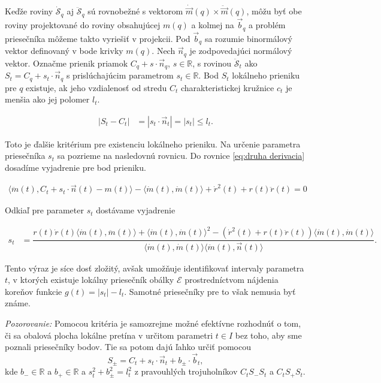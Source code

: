 Keďže roviny $\mathcal{\dot{S}}_q $ aj $\mathcal{\ddot{S}}_q $ sú rovnobežné s vektorom $ \dot{\vec{m}}(q) \times \ddot{\vec{m}}(q) $, môžu byť obe roviny projektované do roviny obsahujúcej $ m(q) $ a kolmej na $ \vec{b}_q $ a problém priesečníka môžeme takto vyriešiť v projekcii. Pod $ \vec{b}_q $ sa rozumie binormálový vektor definovaný v bode krivky $ m(q) $. Nech $\vec{n}_q$ je zodpovedajúci normálový vektor. Označme prienik priamok $C_q + s \cdot \vec{n}_q$, $s \in \mathbb{R}$, s rovinou $\mathcal{\ddot{S}}_t$ ako $S_t = C_q + s_t \cdot \vec{n}_q$ s prislúchajúcim parametrom $s_t \in \mathbb{R}$. Bod $S_t$ lokálneho prieniku pre $q$ existuje, ak jeho vzdialenosť od stredu $C_t$ charakteristickej kružnice $c_t$ je menšia ako jej polomer $l_t.$ 

\begin{align*}
| S_t - C_t | &= | s_t \cdot \vec{n}_t | = | s_t | \leq l_t.
\end{align*}

Toto je ďalšie kritérium pre existenciu lokálneho prieniku. Na určenie parametra priesečníka $ s_t $ sa pozrieme na nasledovnú rovnicu. Do rovnice \ref{eq:druha derivacia} dosadíme vyjadrenie pre bod prieniku.

\begin{align*}
\langle \ddot{m}(t), C_t + s_t \cdot \vec{n}(t) - m(t) \rangle - \langle \dot{m}(t), \dot{m}(t) \rangle + \dot{r}^2(t) + r(t)\ddot{r}(t) = 0
\end{align*}

Odkiaľ pre parameter $ s_t $ dostávame vyjadrenie

\begin{align*}
s_t &= \dfrac{ r(t) \dot{r}(t) \langle \dot{m}(t), \ddot{m}(t) \rangle + \langle \dot{m}(t), \dot{m}(t) \rangle^2 - \left( \dot{r}^2(t) + r(t)\ddot{r}(t) \right) \langle \dot{m}(t), \dot{m}(t) \rangle}{\langle \dot{m}(t), \dot{m}(t) \rangle \langle \ddot{m}(t) , \vec{n}(t) \rangle}.
\end{align*}

Tento výraz je síce dosť zložitý, avšak umožňuje identifikovať intervaly parametra $ t $, v ktorých existuje lokálny priesečník obálky $ \mathcal{E} $ prostredníctvom nájdenia koreňov funkcie $ g(t) = | s_t | - l_t $. Samotné priesečníky pre to však nemusia byť známe.

\textit{Pozorovanie:}
Pomocou kritéria je samozrejme možné efektívne rozhodnúť o tom, či sa obalová plocha lokálne pretína v určitom parametri $t \in I$ bez toho, aby sme poznali priesečníky bodov. Tie sa potom dajú ľahko určiť pomocou
$$
S_{\pm} = C_{t} + s_{t} \cdot \vec{n}_{t} + b_{\pm} \cdot \vec{b}_{t},
$$
kde $ b_{-} \in \mathbb{R} $ a $ b_{+} \in \mathbb{R} $ a $s_t^2 + b_{\pm}^2 = l_t^2 $ z pravouhlých trojuholníkov $C_{t}S_{-}S_{t}$ a $C_{t}S_{+}S_{t}.$


